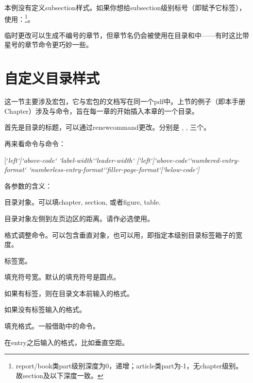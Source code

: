 本例没有定义subsection样式。如果你想给subsection级别标号（即赋予它标签），使用：\footnote{report/book类part级别深度为0，递增；article类part为-1，无chapter级别。故section及以下深度一致。}。

临时更改可以生成不编号的章节，但章节名仍会被使用在目录和中——有时这比带星号的章节命令更巧妙一些。

\section{自定义目录样式}
\label{sec:titletoc}
这一节主要涉及宏包，它与宏包的文档写在同一个pdf中。上节的例子（即本手册Chapter）涉及与命令，旨在每一章的开始插入本章的一个目录。

首先是目录的标题，可以通过renewcommand更改。分别是 , , 三个。

再来看命令与命令：
\begin{latex}
[`\itshape left`]{`\itshape above-code`}
    {`\itshape label-width`}{`\itshape leader-width`}
[`\itshape left`]{`\itshape above-code`}{`\itshape numbered-entry-format`}
    {`\itshape numberless-entry-format`}{`\itshape filler-page-format`}[`\itshape below-code`]
\end{latex}

各参数的含义：
\begin{para}
\item[section:] 目录对象。可以填chapter, section, 或者figure, table.
\item[left:] 目录对象左侧到左页边区的距离。请作必选使用。
\item[above-code:] 格式调整命令。可以包含垂直对象，也可以用，即指定本级别目录标签箱子的宽度。
\item[label-width:] 标签宽。
\item[leader-width:] 填充符号宽。默认的填充符号是圆点。
\item[numered-entry-format:] 如果有标签，则在目录文本前输入的格式。
\item[numberless-entry-format:] 如果没有标签输入的格式。
\item[filler-page-format:] 填充格式。一般借助中的命令。
\item[below-code:] 在entry之后输入的格式，比如垂直空距。
\end{para}

